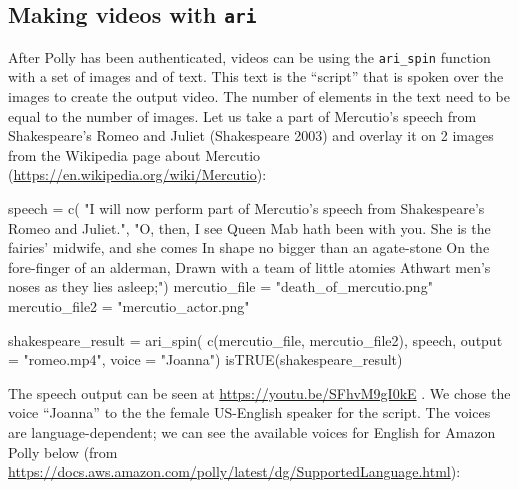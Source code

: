 \hypertarget{making-videos-with-ari-1}{%
\subsection{\texorpdfstring{Making videos with
\texttt{ari}}{Making videos with ari}}\label{making-videos-with-ari-1}}

After Polly has been authenticated, videos can be using the
\texttt{ari\_spin} function with a set of images and of text. This text
is the ``script'' that is spoken over the images to create the output
video. The number of elements in the text need to be equal to the number
of images. Let us take a part of Mercutio's speech from Shakespeare's
Romeo and Juliet (Shakespeare 2003) and overlay it on 2 images from the
Wikipedia page about Mercutio
(\url{https://en.wikipedia.org/wiki/Mercutio}):

\begin{Schunk}
\begin{Sinput}
speech =  c(
  "I will now perform part of Mercutio's speech from Shakespeare's Romeo and Juliet.", 
  "O, then, I see Queen Mab hath been with you.
   She is the fairies' midwife, and she comes
   In shape no bigger than an agate-stone
   On the fore-finger of an alderman,
   Drawn with a team of little atomies
   Athwart men's noses as they lies asleep;")
mercutio_file = "death_of_mercutio.png"
mercutio_file2 = "mercutio_actor.png"
\end{Sinput}
\end{Schunk}

\begin{Schunk}
\begin{Sinput}
shakespeare_result = ari_spin(
  c(mercutio_file, mercutio_file2),
  speech, output = "romeo.mp4", voice = "Joanna")
isTRUE(shakespeare_result)
\end{Sinput}
\end{Schunk}

The speech output can be seen at \url{https://youtu.be/SFhvM9gI0kE} . We
chose the voice ``Joanna'' to the the female US-English speaker for the
script. The voices are language-dependent; we can see the available
voices for English for Amazon Polly below (from
\url{https://docs.aws.amazon.com/polly/latest/dg/SupportedLanguage.html}):


